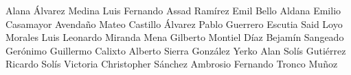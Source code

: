 Alana Álvarez Medina
Luis Fernando Assad Ramírez
Emil Bello Aldana
Emilio Casamayor Avendaño
Mateo Castillo Álvarez
Pablo Guerrero Escutia
Said Loyo Morales
Luis Leonardo Miranda Mena
Gilberto Montiel Díaz
Bejamín Sangeado Gerónimo
Guillermo Calixto Alberto Sierra González
Yerko Alan Solís Gutiérrez
Ricardo Solís Victoria
Christopher Sánchez Ambrosio
Fernando Tronco Muñoz
